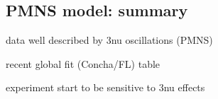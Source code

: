 \subsection{ PMNS model: summary}
\label{sec:summary}

data well described by 3nu oscillations (PMNS)

recent global fit (Concha/FL) table

experiment start to be sensitive to 3nu effects

